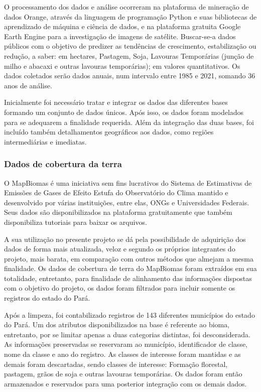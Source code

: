 O processamento dos dados e análise ocorreram na plataforma de mineração de dados Orange, através da linguagem de programação Python e suas bibliotecas de aprendizado de máquina e ciência de dados, e na plataforma gratuita Google Earth Engine para a investigação de imagens de satélite. Buscar-se-a dados públicos com o objetivo de predizer as tendências de crescimento, estabilização ou redução, a saber: em hectares,
Pastagem, Soja, Lavouras Temporárias (junção de milho e abacaxi e outras lavouras temporárias); em valores quantitativos. Os dados coletados serão dados anuais, num intervalo entre 1985 e 2021, somando 36 anos
de análise.

Inicialmente foi necessário tratar e integrar os dados das diferentes bases formando um conjunto de dados únicos. Após isso, os dados foram modelados para se adequarem a finalidade requerida. Além da integração das duas bases, foi incluído também detalhamentos geográficos aos dados, como regiões intermediárias e imediatas.



\subsubsection{Dados de cobertura da terra}

O MapBiomas é uma iniciativa sem fins lucrativos do Sistema de Estimativas de Emissões de Gases de Efeito Estufa do Observatório do Clima mantido e desenvolvido por várias instituições, entre elas, ONGs e Universidades Federais. Seus dados são disponibilizados na plataforma gratuitamente que também disponibiliza tutoriais para baixar os arquivos. 

A sua utilização no presente projeto se dá pela possibilidade de adquirição dos dados de forma mais atualizada, veloz e segundo os próprios integrantes do projeto, mais barata, em comparação com outros métodos que almejam a mesma finalidade. Os dados de cobertura de terra do MapBiomas foram extraídos em sua totalidade, entretanto, para finalidade de alinhamento das informações dispostas com o objetivo do projeto, os dados foram filtrados para incluir somente os registros do estado do Pará. 

Após a limpeza, foi contabilizado registros de 143 diferentes municípios do estado do Pará. Um dos atributos disponibilizados na base é referente ao bioma, entretanto, por se limitar apenas a duas categorias distintas, foi desconsiderada. As informações preservadas se reservaram ao município, identificador de classe, nome da classe e ano do registro. As classes de interesse foram mantidas e as demais foram descartadas, sendo classes de interesse: Formação florestal, pastagem, grãos de soja e outras lavouras temporárias. Os dados foram então armazenados e reservados para uma posterior integração com os demais dados.


